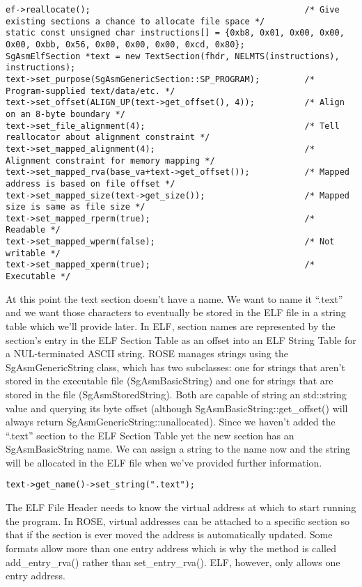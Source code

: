 \begin{verbatim}
ef->reallocate();                                           /* Give existing sections a chance to allocate file space */
static const unsigned char instructions[] = {0xb8, 0x01, 0x00, 0x00, 0x00, 0xbb, 0x56, 0x00, 0x00, 0x00, 0xcd, 0x80};
SgAsmElfSection *text = new TextSection(fhdr, NELMTS(instructions), instructions);
text->set_purpose(SgAsmGenericSection::SP_PROGRAM);         /* Program-supplied text/data/etc. */
text->set_offset(ALIGN_UP(text->get_offset(), 4));          /* Align on an 8-byte boundary */
text->set_file_alignment(4);                                /* Tell reallocator about alignment constraint */
text->set_mapped_alignment(4);                              /* Alignment constraint for memory mapping */
text->set_mapped_rva(base_va+text->get_offset());           /* Mapped address is based on file offset */
text->set_mapped_size(text->get_size());                    /* Mapped size is same as file size */
text->set_mapped_rperm(true);                               /* Readable */
text->set_mapped_wperm(false);                              /* Not writable */
text->set_mapped_xperm(true);                               /* Executable */
\end{verbatim}

At this point the text section doesn't have a name. We want to name it
``.text'' and we want those characters to eventually be stored in the
ELF file in a string table which we'll provide later. In ELF, section
names are represented by the section's entry in the ELF Section Table
as an offset into an ELF String Table for a NUL-terminated ASCII
string. ROSE manages strings using the SgAsmGenericString class, which
has two subclasses: one for strings that aren't stored in the
executable file (SgAsmBasicString) and one for strings that are stored
in the file (SgAsmStoredString). Both are capable of string an
std::string value and querying its byte offset (although
SgAsmBasicString::get\_offset() will always return
SgAsmGenericString::unallocated).  Since we haven't added the
``.text'' section to the ELF Section Table yet the new section has an
SgAsmBasicString name. We can assign a string to the name now and the
string will be allocated in the ELF file when we've provided further
information.

\begin{verbatim}
text->get_name()->set_string(".text");
\end{verbatim}

The ELF File Header needs to know the virtual address at which to
start running the program. In ROSE, virtual addresses can be attached
to a specific section so that if the section is ever moved the address
is automatically updated. Some formats allow more than one entry
address which is why the method is called add\_entry\_rva() rather than
set\_entry\_rva(). ELF, however, only allows one entry address.

